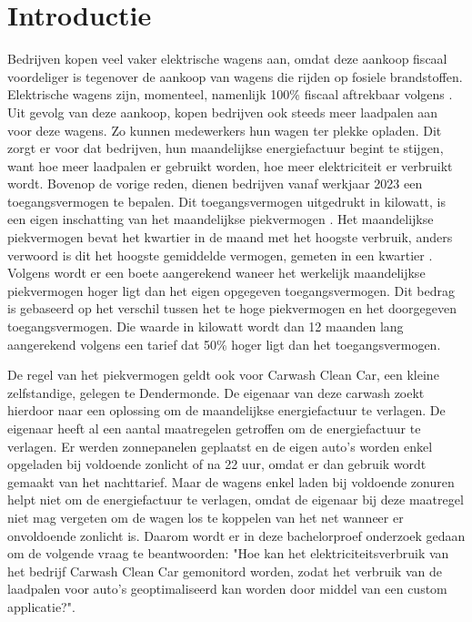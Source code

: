 
\section{Introductie}%
\label{sec:introductie}

Bedrijven kopen veel vaker elektrische wagens aan, omdat deze aankoop fiscaal voordeliger is tegenover de aankoop van wagens die rijden op fosiele brandstoffen. Elektrische wagens zijn, momenteel, namenlijk 100\% fiscaal aftrekbaar volgens \textcite{Blomme2023}. Uit gevolg van deze aankoop, kopen bedrijven ook steeds meer laadpalen aan voor deze wagens. Zo kunnen medewerkers hun wagen ter plekke opladen. Dit zorgt er voor dat bedrijven, hun maandelijkse energiefactuur begint te stijgen, want hoe meer laadpalen er gebruikt worden, hoe meer elektriciteit er verbruikt wordt. Bovenop de vorige reden, dienen bedrijven vanaf werkjaar 2023 een toegangsvermogen te bepalen. Dit toegangsvermogen uitgedrukt in kilowatt, is een eigen inschatting van het maandelijkse piekvermogen \autocite{Fluvius2022}. Het maandelijkse piekvermogen bevat het kwartier in de maand met het hoogste verbruik, anders verwoord is dit het hoogste gemiddelde vermogen, gemeten in een kwartier \autocite{Fluvius2022}. Volgens \textcite{Fluvius2022} wordt er een boete aangerekend waneer het werkelijk maandelijkse piekvermogen hoger ligt dan het eigen opgegeven toegangsvermogen. Dit bedrag is gebaseerd op het verschil tussen het te hoge piekvermogen en het doorgegeven toegangsvermogen. Die waarde in kilowatt wordt dan 12 maanden lang aangerekend volgens een tarief dat 50\% hoger ligt dan het toegangsvermogen.

De regel van het piekvermogen geldt ook voor Carwash Clean Car, een kleine zelfstandige, gelegen te Dendermonde. De eigenaar van deze carwash zoekt hierdoor naar een oplossing om de maandelijkse energiefactuur te verlagen. De eigenaar heeft al een aantal maatregelen getroffen om de energiefactuur te verlagen. Er werden zonnepanelen geplaatst en de eigen auto's worden enkel opgeladen bij voldoende zonlicht of na 22 uur, omdat er dan gebruik wordt gemaakt van het nachttarief. Maar de wagens enkel laden bij voldoende zonuren helpt niet om de energiefactuur te verlagen, omdat de eigenaar bij deze maatregel niet mag vergeten om de wagen los te koppelen van het net wanneer er onvoldoende zonlicht is. Daarom wordt er in deze bachelorproef onderzoek gedaan om de volgende vraag te beantwoorden: "Hoe kan het elektriciteitsverbruik van het bedrijf Carwash Clean Car gemonitord worden, zodat het verbruik van de laadpalen voor auto's geoptimaliseerd kan worden door middel van een custom applicatie?".

